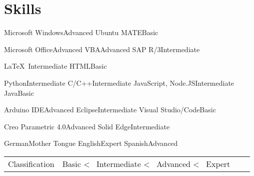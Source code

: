 
\section*{Skills}
\medskip





	{Microsoft Windows}{Advanced}
	{Ubuntu MATE}{Basic}
	{}{}
	{}{}



%
	{Microsoft Office}{Advanced}
	{VBA}{Advanced}
	{SAP R/3}{Intermediate}
	{}{}
	

%
	{\LaTeX\ }{Intermediate}
	{HTML}{Basic}
	{}{}
	{}{}
	

%
	{Python}{Intermediate}	
	{C/C++}{Intermediate}
	{JavaScript, Node.JS}{Intermediate}
	{Java}{Basic}



{Arduino IDE}{Advanced}	
{Eclipse}{Intermediate}
{Visual Studio/Code}{Basic}
{}{}


	{}{}
	{}{}
	{}{}
	
	
	{Creo Parametric 4.0}{Advanced}
	{Solid Edge}{Intermediate}
	{}{}
	{}{}


	{German}{Mother Tongue}
	{English}{Expert}
	{Spanish}{Advanced}
	{}{}
	
	
	

\noindent
\begin{tabular*}{\textwidth}{@{}R{6cm}|lll}
	\noindent
	{\small Classification}	&	{\small Basic \textless~ Intermediate \textless~ Advanced \textless~ Expert}
\end{tabular*}
